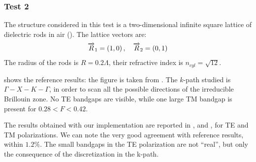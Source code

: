 \subsubsection{Test 2}

The structure considered in this test is a two-dimensional infinite
square lattice of dielectric rods in air
(). The lattice vectors are:
\begin{equation*}
  \overrightarrow{R}_1 = \left(1,0\right), \quad \overrightarrow{R}_2 =
  \left(0,1\right)
\end{equation*}
The radius of the rods is $R = 0.2 \Lambda$, their refractive index is
$n_{cyl} = \sqrt{12}$.

 shows the reference results: the figure is
taken from \cite{johnson_photonic}. The $k$-path studied is
$\Gamma-X-K-\Gamma$, in order to scan all the possible directions of
the irreducible Brillouin zone. No TE bandgaps are visible, while one
large TM bandgap is present for $0.28 < F < 0.42$.

The results obtained with our implementation are reported in
,  and , for TE and TM
polarizations. We can note the very good agreement with
reference results, within $1.2\%$. The small bandgaps in the TE
polarization are not ``real'', but only the consequence of the
discretization in the k-path.

